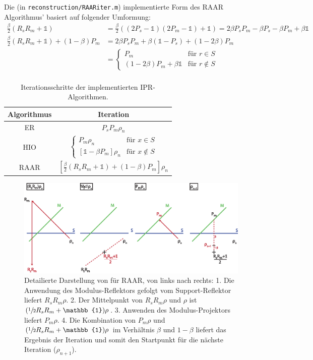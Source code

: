 	Die (in \texttt{reconstruction/RAARiter.m}) implementierte Form des RAAR Algorithmus' basiert auf folgender Umformung:
	\begin{align*}
	\frac{\beta}{2}\left(R_sR_m+\mathbb{1}\right)
	&=\frac{\beta}{2}\left((2P_s-\mathbb{1})(2P_m-\mathbb{1})+\mathbb{1}\right)
		=2\beta P_sP_m-\beta P_s-\beta P_m+\beta\mathbb{1}\\
		\frac{\beta}{2}\left(R_sR_m+\mathbb{1}\right)+\left(1-\beta\right) P_m
		&=2\beta P_sP_m+\beta (\mathbb{1}-P_s)+ (1-2\beta)P_m\\
		&=
		\begin{cases}
			P_m &\text{für } r\in S\\
			(1-2\beta)P_m+\beta\mathbb{1}  &\text{für } r\notin S
		\end{cases}\\
	\end{align*}
\begin{table}
	\centering
	\begin{tabular}{cc}
		\hline\hline
		Algorithmus 	&Iteration\\ 							
		\hline
		ER  			&$P_sP_m\rho_n$\\ 								
		HIO  			&$\begin{cases}	
		P_m\rho_n  &\text{für } x\in S\\
		\left[\mathbb{1}-\beta P_m\right]\rho_n &\text{für } x\notin S
		\end{cases}$\\
		RAAR  			&$\left[\frac{\beta}{2}\left(R_sR_m+\mathbb{1}\right)+\left(1-\beta\right)P_m\right]\rho_n$\\																
		\hline\hline
	\end{tabular}
	\caption[IPR-Algorithmen]{Iterationsschritte der implementierten IPR-Algorithmen.}
	\label{tab:ipr}
\end{table}	

	\begin{figure}
		\centering
		\includegraphics[width=1\textwidth]{images/raar.eps}
		\caption[RAAR]{Detailierte Darstellung von  für RAAR, von links nach rechts: 1. Die Anwendung des Modulus-Reflektors gefolgt vom Support-Reflektor liefert $R_sR_m\rho$. 2. Der Mittelpunkt von $R_sR_m\rho$ und $\rho$ ist $(\sfrac{1}{2}R_sR_m+\mathbb{1})\rho$. 3. Anwenden des Modulus-Projektors liefert $P_m\rho$. 4. Die Kombination von $P_m\rho$ und $(\sfrac{1}{2}R_sR_m+\mathbb{1})\rho$ im Verhältnis $\beta$ und $1-\beta$ liefert das Ergebnis der Iteration  und somit den Startpunkt für die nächste Iteration ($\rho_{n+1}$).}
		\label{fig:raar}
	\end{figure} 	
